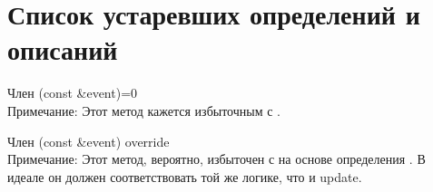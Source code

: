 \chapter{Список устаревших определений и описаний }
\hypertarget{deprecated}{}\label{deprecated}

\begin{DoxyRefList}
\item[Член \doxylink{classIObserver_a325451b0d0100feaad6f683850a616dc}{IObserver\+::notify} (const \doxylink{structEvent}{Event} \&event)=0]\hfill \\
\label{deprecated__deprecated000001}%
%
Примечание\+: Этот метод кажется избыточным с .  
\item[Член \doxylink{classLogger_a96a2b88ee6d81d3ecf0fed3a6291c9a2}{Logger\+::notify} (const \doxylink{structEvent}{Event} \&event) override]\hfill \\
\label{deprecated__deprecated000002}%
%
Примечание\+: Этот метод, вероятно, избыточен с  на основе определения . В идеале он должен соответствовать той же логике, что и {\ttfamily update}. 
\end{DoxyRefList}